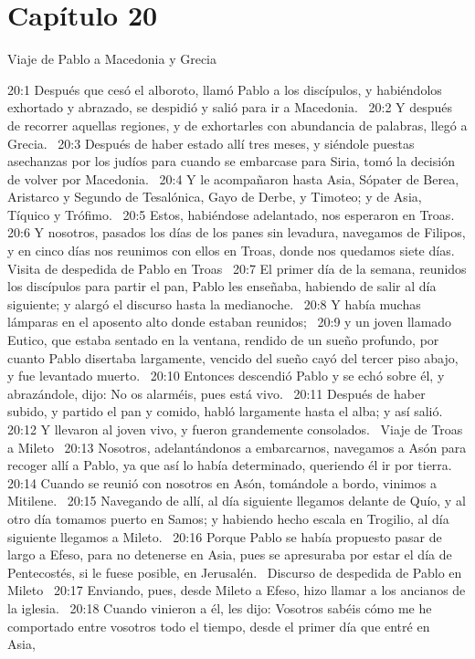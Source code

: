 \section*{Capítulo 20}
Viaje de Pablo a Macedonia y Grecia  

20:1 Después que cesó el alboroto, llamó Pablo a los discípulos, y habiéndolos exhortado y abrazado, se despidió y salió para ir a Macedonia.  
20:2 Y después de recorrer aquellas regiones, y de exhortarles con abundancia de palabras, llegó a Grecia.  
20:3 Después de haber estado allí tres meses, y siéndole puestas asechanzas por los judíos para cuando se embarcase para Siria, tomó la decisión de volver por Macedonia.  
20:4 Y le acompañaron hasta Asia, Sópater de Berea, Aristarco y Segundo de Tesalónica, Gayo de Derbe, y Timoteo; y de Asia, Tíquico y Trófimo.  
20:5 Estos, habiéndose adelantado, nos esperaron en Troas.  
20:6 Y nosotros, pasados los días de los panes sin levadura, navegamos de Filipos, y en cinco días nos reunimos con ellos en Troas, donde nos quedamos siete días.  
Visita de despedida de Pablo en Troas  
20:7 El primer día de la semana, reunidos los discípulos para partir el pan, Pablo les enseñaba, habiendo de salir al día siguiente; y alargó el discurso hasta la medianoche.  
20:8 Y había muchas lámparas en el aposento alto donde estaban reunidos;  
20:9 y un joven llamado Eutico, que estaba sentado en la ventana, rendido de un sueño profundo, por cuanto Pablo disertaba largamente, vencido del sueño cayó del tercer piso abajo, y fue levantado muerto.  
20:10 Entonces descendió Pablo y se echó sobre él, y abrazándole, dijo: No os alarméis, pues está vivo.  
20:11 Después de haber subido, y partido el pan y comido, habló largamente hasta el alba; y así salió.  
20:12 Y llevaron al joven vivo, y fueron grandemente consolados.  
Viaje de Troas a Mileto  
20:13 Nosotros, adelantándonos a embarcarnos, navegamos a Asón para recoger allí a Pablo, ya que así lo había determinado, queriendo él ir por tierra.  
20:14 Cuando se reunió con nosotros en Asón, tomándole a bordo, vinimos a Mitilene.  
20:15 Navegando de allí, al día siguiente llegamos delante de Quío, y al otro día tomamos puerto en Samos; y habiendo hecho escala en Trogilio, al día siguiente llegamos a Mileto.  
20:16 Porque Pablo se había propuesto pasar de largo a Efeso, para no detenerse en Asia, pues se apresuraba por estar el día de Pentecostés, si le fuese posible, en Jerusalén.  
Discurso de despedida de Pablo en Mileto  
20:17 Enviando, pues, desde Mileto a Efeso, hizo llamar a los ancianos de la iglesia.  
20:18 Cuando vinieron a él, les dijo: Vosotros sabéis cómo me he comportado entre vosotros todo el tiempo, desde el primer día que entré en Asia,  
